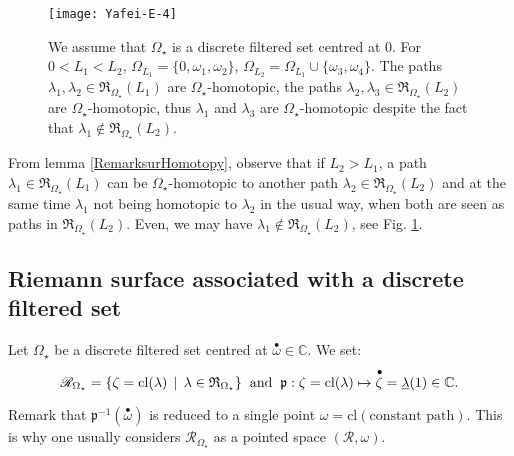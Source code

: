 \documentclass[11pt, english]{smfart}
\theoremstyle{definition}
\begin{document}
\begin{figure}[thp]
  \centering\texttt{[image: Yafei-E-4]}\\
  \centering\caption{We assume that $\Omega_\star$ is a  discrete
    filtered set centred at $0$. For $0 < L_1 < L_2$,  $\Omega_{L_1} =
    \{0,\omega_1, \omega_2\}$, $\Omega_{L_2} = \Omega_{L_1} \cup
    \{\omega_3, \omega_4\}$. The paths ${ \lambda_1, \lambda_2 \in
    \mathfrak{R}_{\Omega_\star}(L_1) }$ are  $\Omega_\star$-homotopic,
    the paths $\lambda_2, \lambda_3 \in 
    \mathfrak{R}_{\Omega_\star}(L_2)$ are $\Omega_\star$-homotopic,
    thus $\lambda_1$ and $\lambda_3$ are $\Omega_\star$-homotopic
    despite the fact that $\lambda_1 \notin \mathfrak{R}_{\Omega_\star}(L_2)$.
  }\label{Yafei-E-4}
\end{figure}

From lemma \ref{RemarksurHomotopy}, observe that  if $L_2 > L_1$, a path $\lambda_1 \in
\mathfrak{R}_{\Omega_\star}(L_1)$ can be  $\Omega_\star$-homotopic to another
path  $\lambda_2 \in  \mathfrak{R}_{\Omega_\star}(L_2)$ and at the
same time $\lambda_1$ not being homotopic to $\lambda_2$ in the usual way,
when both are seen as paths in  $\mathfrak{R}_{\Omega_\star}(L_2)$. 
Even, we may have $\lambda_1 \notin
\mathfrak{R}_{\Omega_\star}(L_2)$, see Fig. \ref{Yafei-E-4}.

\subsection{Riemann surface associated with a discrete filtered set}

\begin{defi}\label{homotopyclass}
Let $\Omega_\star$ be a discrete filtered set centred at
${ {\stackrel{\bullet}{\omega}} } \in \mathbb{C}$. We set:
$$\mathscr{R}_{\Omega_\star} = \{\zeta = \mathrm{cl}(\lambda) \, \mid \, \lambda \in
\mathfrak{R}_{\Omega_\star}\} 
\hspace{2mm} \mbox{and} \hspace{2mm} \mathfrak{p} : \zeta = 
\mathrm{cl}(\lambda) \mapsto
{ {\stackrel{\bullet}{\zeta}} } = \underline{\lambda}(1) \in \mathbb{C}.
$$
\end{defi}

Remark that  $\mathfrak{p}^{-1}({ {\stackrel{\bullet}{\omega}} })$ is reduced to a single
point $\omega = \mathrm{cl}(\mbox{constant path})$. 
 This is why  one usually considers $\mathscr{R}_{\Omega_\star}$ as a pointed
space $(\mathscr{R},\omega)$.
\end{document}

